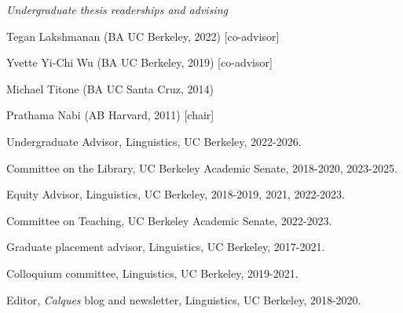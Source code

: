 \documentclass[12pt]{article}
\begin{document}





 
\medskip


 
 
  
 \medskip
 
 
\noindent\emph{Undergraduate thesis readerships and advising\vspace{0.05in}}



\ind Tegan Lakshmanan (BA UC Berkeley, 2022) [co-advisor]
 
\ind Yvette Yi-Chi Wu (BA UC Berkeley, 2019) [co-advisor]
 
\ind Michael Titone (BA UC Santa Cruz, 2014)

\ind Prathama Nabi (AB Harvard, 2011) [chair]



\bigskip





\ind Undergraduate Advisor, Linguistics, UC Berkeley, 2022-2026.

\ind Committee on the Library, UC Berkeley Academic Senate, 2018-2020, 2023-2025.

\ind Equity Advisor, Linguistics, UC Berkeley, 2018-2019, 2021, 2022-2023.

\ind Committee on Teaching, UC Berkeley Academic Senate, 2022-2023.

\ind Graduate placement advisor, Linguistics, UC Berkeley, 2017-2021.


\ind Colloquium committee, Linguistics, UC Berkeley, 2019-2021. 

\ind Editor, \emph{Calques} blog and newsletter, Linguistics, UC Berkeley, 2018-2020. 
\end{document}
